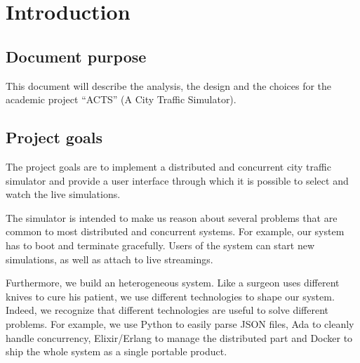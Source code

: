 \section{Introduction}
\subsection{Document purpose}
This document will describe the analysis, the design and the choices for the
academic project ``ACTS'' (A City Traffic Simulator).

\subsection{Project goals}\label{projectGoals}
The project goals are to implement a distributed and concurrent city
traffic simulator and provide a user interface through which it is possible to
select and watch the live simulations.

The simulator is intended to make us reason about several problems that
are common to most distributed and concurrent systems. For
example, our system has to boot and terminate gracefully.
Users of the system can start new simulations, as well as attach to live
streamings.

Furthermore, we build an heterogeneous system.
Like a surgeon uses different knives to cure his patient, we use different
technologies to shape our system.
Indeed, we recognize that different technologies are useful to solve
different problems. For example, we use Python to easily parse JSON files,
Ada to cleanly handle concurrency, Elixir/Erlang to manage
the distributed part and Docker to ship the whole system as a
single portable product.
